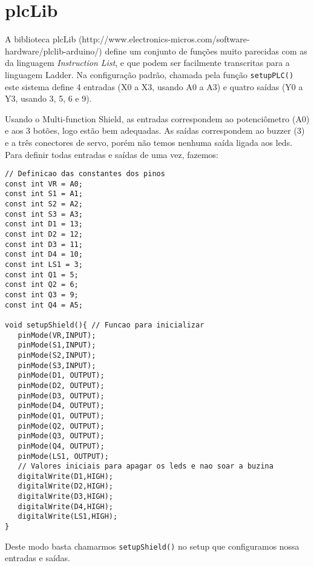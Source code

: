 \section{plcLib}

A biblioteca plcLib (http://www.electronics-micros.com/software-hardware/plclib-arduino/) define um conjunto de funções muito parecidas com as da linguagem \emph{Instruction List}, e que podem ser facilmente transcritas para a linguagem Ladder. Na configuração padrão, chamada pela função \lstinline|setupPLC()| este sistema define 4 entradas (X0 a X3, usando A0 a A3) e quatro saídas (Y0 a Y3, usando 3, 5, 6 e 9).

Usando o Multi-function Shield, as entradas correspondem ao potenciômetro (A0) e aos 3 botões, logo estão bem adequadas. As saídas correspondem ao buzzer (3) e a três conectores de servo, porém não temos nenhuma saída ligada aos leds. Para definir todas entradas e saídas de uma vez, fazemos:
\begin{lstlisting}[caption=Definição de função e constantes para usar o o Multi-function Shield com o plcLib., label=lst:setupShield]
// Definicao das constantes dos pinos
const int VR = A0;
const int S1 = A1;
const int S2 = A2;
const int S3 = A3;
const int D1 = 13;
const int D2 = 12;
const int D3 = 11;
const int D4 = 10;
const int LS1 = 3;
const int Q1 = 5; 
const int Q2 = 6; 
const int Q3 = 9; 
const int Q4 = A5; 
 
void setupShield(){ // Funcao para inicializar
   pinMode(VR,INPUT);
   pinMode(S1,INPUT);
   pinMode(S2,INPUT);
   pinMode(S3,INPUT);
   pinMode(D1, OUTPUT);
   pinMode(D2, OUTPUT);
   pinMode(D3, OUTPUT);
   pinMode(D4, OUTPUT);
   pinMode(Q1, OUTPUT);
   pinMode(Q2, OUTPUT);
   pinMode(Q3, OUTPUT);
   pinMode(Q4, OUTPUT);
   pinMode(LS1, OUTPUT);
   // Valores iniciais para apagar os leds e nao soar a buzina
   digitalWrite(D1,HIGH); 
   digitalWrite(D2,HIGH);
   digitalWrite(D3,HIGH);
   digitalWrite(D4,HIGH);
   digitalWrite(LS1,HIGH);
}
\end{lstlisting}

Deste modo basta chamarmos \lstinline|setupShield()| no setup que configuramos nossa entradas e saídas.

